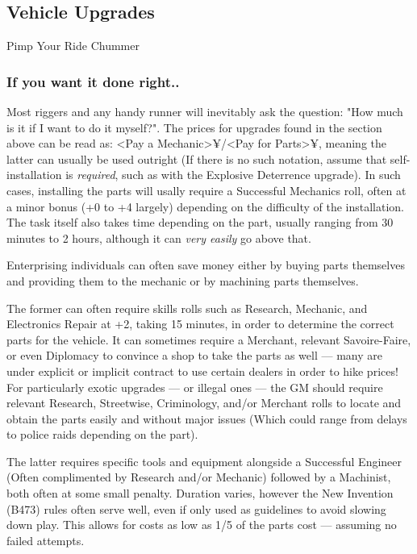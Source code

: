  
\begin{multicols*}{2}	
	
	\subsection{Vehicle Upgrades}
	
	Pimp Your Ride Chummer
	
	\subsubsection{If you want it done right..}
	
	Most riggers and any handy runner will inevitably ask the question: "How much is it if I want to do it myself?". The prices for upgrades found in the section above can be read as: <Pay a Mechanic>¥/<Pay for Parts>¥, meaning the latter can usually be used outright (If there is no such notation, assume that self-installation is \textit{required}, such as with the Explosive Deterrence upgrade). In such cases, installing the parts will usally require a Successful Mechanics roll, often at a minor bonus (+0 to +4 largely) depending on the difficulty of the installation. The task itself also takes time depending on the part, usually ranging from 30 minutes to 2 hours, although it can \textit{very easily} go above that.
	
	Enterprising individuals can often save money either by buying parts themselves and providing them to the mechanic or by machining parts themselves. 
	
	The former can often require skills rolls such as Research, Mechanic, and Electronics Repair at +2, taking 15 minutes, in order to determine the correct parts for the vehicle. It can sometimes require a Merchant, relevant Savoire-Faire, or even Diplomacy to convince a shop to take the parts as well — many are under explicit or implicit contract to use certain dealers in order to hike prices! For particularly exotic upgrades — or illegal ones — the GM should require relevant Research, Streetwise, Criminology, and/or Merchant rolls to locate and obtain the parts easily and without major issues (Which could range from delays to police raids depending on the part).
	
	The latter requires specific tools and equipment alongside a Successful Engineer (Often complimented by Research and/or Mechanic) followed by a Machinist, both often at some small penalty. Duration varies, however the New Invention (B473) rules often serve well, even if only used as guidelines to avoid slowing down play. This allows for costs as low as 1/5 of the parts cost — assuming no failed attempts.
	

\end{multicols*}
